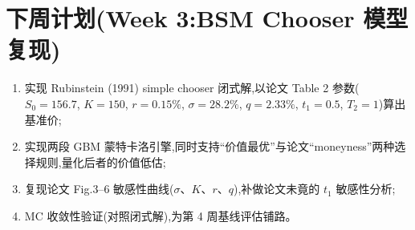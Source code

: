 \documentclass[11pt]{ctexart}
\begin{document}
\section{下周计划(Week 3:BSM Chooser 模型复现)}
\begin{enumerate}
  \item 实现 Rubinstein (1991) simple chooser 闭式解,以论文 Table 2 参数($S_0=156.7$, $K=150$, $r=0.15\%$, $\sigma=28.2\%$, $q=2.33\%$, $t_1=0.5$, $T_2=1$)算出基准价;
  \item 实现两段 GBM 蒙特卡洛引擎,同时支持``价值最优''与论文``moneyness''两种选择规则,量化后者的价值低估;
  \item 复现论文 Fig.3--6 敏感性曲线($\sigma$、$K$、$r$、$q$),补做论文未竟的 $t_1$ 敏感性分析;
  \item MC 收敛性验证(对照闭式解),为第 4 周基线评估铺路。
\end{enumerate}
\end{document}
